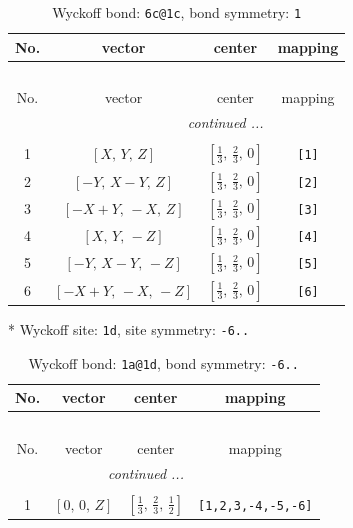 \documentclass[fleqn,8pt]{jsarticle}
\begin{document}
\begin{longtable}{cccc}
\caption{Wyckoff bond: {\tt 6c@1c}, bond symmetry: {\tt 1}}
 \\
 \hline \hline
No. & vector & center & mapping \\ \hline \endfirsthead

\multicolumn{3}{l}{\tablename\ \thetable{}} \\
 \hline \hline
No. & vector & center & mapping \\ \hline \endhead

 \hline \hline
\multicolumn{3}{r}{\footnotesize\it continued ...} \\ \endfoot

 \hline \hline
\multicolumn{3}{r}{} \\ \endlastfoot

1 & $\left[ X,\, Y,\, Z \right]$ & $\left[ \frac{1}{3},\, \frac{2}{3},\, 0 \right]$ & {\tt [1]} \\ \hline
2 & $\left[ - Y,\, X - Y,\, Z \right]$ & $\left[ \frac{1}{3},\, \frac{2}{3},\, 0 \right]$ & {\tt [2]} \\ \hline
3 & $\left[ - X + Y,\, - X,\, Z \right]$ & $\left[ \frac{1}{3},\, \frac{2}{3},\, 0 \right]$ & {\tt [3]} \\ \hline
4 & $\left[ X,\, Y,\, - Z \right]$ & $\left[ \frac{1}{3},\, \frac{2}{3},\, 0 \right]$ & {\tt [4]} \\ \hline
5 & $\left[ - Y,\, X - Y,\, - Z \right]$ & $\left[ \frac{1}{3},\, \frac{2}{3},\, 0 \right]$ & {\tt [5]} \\ \hline
6 & $\left[ - X + Y,\, - X,\, - Z \right]$ & $\left[ \frac{1}{3},\, \frac{2}{3},\, 0 \right]$ & {\tt [6]} \\
\end{longtable}
* Wyckoff site: {\tt 1d}, site symmetry: {\tt -6..}
\renewcommand{\arraystretch}{1.2}
\begin{longtable}{cccc}
\caption{Wyckoff bond: {\tt 1a@1d}, bond symmetry: {\tt -6..}}
 \\
 \hline \hline
No. & vector & center & mapping \\ \hline \endfirsthead

\multicolumn{3}{l}{\tablename\ \thetable{}} \\
 \hline \hline
No. & vector & center & mapping \\ \hline \endhead

 \hline \hline
\multicolumn{3}{r}{\footnotesize\it continued ...} \\ \endfoot

 \hline \hline
\multicolumn{3}{r}{} \\ \endlastfoot

1 & $\left[ 0,\, 0,\, Z \right]$ & $\left[ \frac{1}{3},\, \frac{2}{3},\, \frac{1}{2} \right]$ & {\tt [1,2,3,-4,-5,-6]} \\
\end{longtable}
\end{document}
